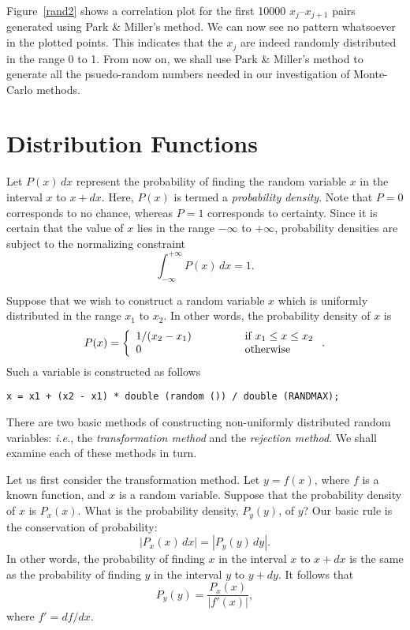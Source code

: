 Figure~\ref{rand2} shows a correlation plot for the first 10000 $x_j$--$x_{j+1}$ pairs generated
using Park \& Miller's method.
We can now see no pattern whatsoever in the plotted points. This indicates that the $x_j$ are indeed
randomly distributed in the range 0 to 1. From now on, we shall use Park \& Miller's method
to generate all the psuedo-random numbers needed in our investigation of Monte-Carlo methods.

\section{Distribution Functions}
Let $P(x)\,dx$ represent the probability of finding the random variable $x$ in the
interval $x$ to $x+dx$. Here, $P(x)$ is termed a {\em probability density}. Note that
$P=0$ corresponds to no chance, whereas $P=1$ corresponds to certainty. Since
it is certain that the value of $x$ lies in the range $-\infty$ to $+\infty$,
probability densities are subject to the normalizing constraint
\begin{equation}
\int_{-\infty}^{+\infty} P(x)\,dx = 1.
\end{equation}

Suppose that we wish to construct a random variable $x$ which is uniformly
distributed in the range $x_1$ to $x_2$. In other words, the probability
density of $x$ is
\begin{equation}
P(x) = \left\{\begin{array}{lcl}
1/(x_2-x_1) &\mbox{\hspace{1cm}}&\mbox{if $x_1 \leq x \leq x_2$}\\
0&& \mbox{otherwise}
\end{array}
\right..
\end{equation}
Such a variable is constructed as follows
\begin{verbatim}
x = x1 + (x2 - x1) * double (random ()) / double (RANDMAX);
\end{verbatim}

There are two basic methods of constructing non-uniformly distributed random variables: 
{\em i.e.}, the {\em transformation method} and the {\em rejection method}. We shall examine
 each of these methods in turn.

Let us first consider the transformation method. Let $y=f(x)$, where $f$ is a known function, and
$x$ is a random variable. Suppose that
the probability density of $x$ is $P_x(x)$. What is the probability density, $P_y(y)$, of $y$?
Our basic rule is the conservation of probability:
\begin{equation}
|P_x(x)\,dx| = |P_y(y)\,dy|.
\end{equation}
In other words, the probability of finding $x$ in the interval $x$ to $x+dx$ is the
same as the probability of finding $y$ in the interval $y$ to $y+dy$. It follows
that
\begin{equation}
P_y(y) = \frac{P_x(x)}{|f'(x)|},
\end{equation}
where $f'=df/dx$.

